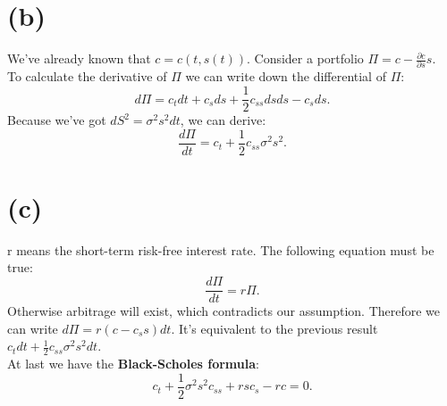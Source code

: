 \documentclass[12pt,a4paper]{paper}
\begin{document}
\section{(b)}
\indent We've already known that $c = c(t, s(t))$. Consider a portfolio $\Pi=c-\frac{\partial c}{\partial s}s$.\\
\indent To calculate the derivative of $\Pi$ we can write down the differential of $\Pi$:
\begin{equation}
d\Pi = c_t dt + c_s ds + \frac{1}{2}c_{ss} ds ds - c_s ds.
\end{equation}
\indent Because we've got $dS^2={\sigma}^{2} s^{2}dt$, we can derive:
\begin{equation}
\frac{d\Pi}{dt}= c_t + \frac{1}{2} c_{ss} \sigma^2 s^2.
\end{equation}

\section{(c)}
\indent r means the short-term risk-free interest rate. The following equation must be true:
\begin{equation}
\frac{d\Pi}{dt}=r\Pi.
\end{equation}
\indent Otherwise arbitrage will exist, which contradicts our assumption. Therefore we can write $d\Pi = r(c - c_s s)dt$. It's equivalent to the previous result $c_t dt + \frac{1}{2} c_{ss} \sigma^2 s^2 dt$.\\
\indent At last we have the \textbf{Black-Scholes formula}:
\begin{equation}
c_t + \frac{1}{2}\sigma^2 s^2 c_{ss} + rsc_s - rc = 0.
\end{equation}
\end{document}
